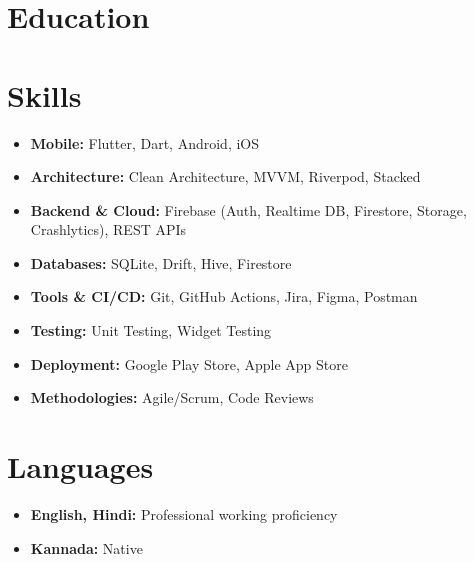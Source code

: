 \documentclass[11pt,a4paper,sans]{moderncv}
\begin{document}

\section{Education}

\section{Skills}
\begin{itemize}
    \item \textbf{Mobile:} Flutter, Dart, Android, iOS
    \item \textbf{Architecture:} Clean Architecture, MVVM, Riverpod, Stacked
    \item \textbf{Backend \& Cloud:} Firebase (Auth, Realtime DB, Firestore, Storage, Crashlytics), REST APIs
    \item \textbf{Databases:} SQLite, Drift, Hive, Firestore
    \item \textbf{Tools \& CI/CD:} Git, GitHub Actions, Jira, Figma, Postman
    \item \textbf{Testing:} Unit Testing, Widget Testing
    \item \textbf{Deployment:} Google Play Store, Apple App Store
    \item \textbf{Methodologies:} Agile/Scrum, Code Reviews
\end{itemize}

\section{Languages}
\begin{itemize}
    \item \textbf{English, Hindi:} Professional working proficiency
    \item \textbf{Kannada:} Native
\end{itemize}
\end{document}
